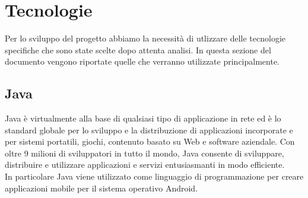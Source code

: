 \section{Tecnologie} 
\label{tecnologie}
Per lo sviluppo del progetto abbiamo la necessità di utlizzare delle tecnologie specifiche che sono state scelte dopo attenta analisi. 
In questa sezione del documento vengono riportate quelle che verranno utilizzate principalmente. 

\subsection{Java}
	
	Java è virtualmente alla base di qualsiasi tipo di applicazione in rete ed è lo standard globale per lo sviluppo e la distribuzione di applicazioni incorporate e per sistemi portatili, giochi, contenuto basato su Web e software aziendale. Con oltre 9 milioni di sviluppatori in tutto il mondo, Java consente di sviluppare, distribuire e utilizzare applicazioni e servizi entusiasmanti in modo efficiente. \\ 
	In particolare Java viene utilizzato come linguaggio di programmazione per creare applicazioni mobile per il sistema operativo Android.
	
